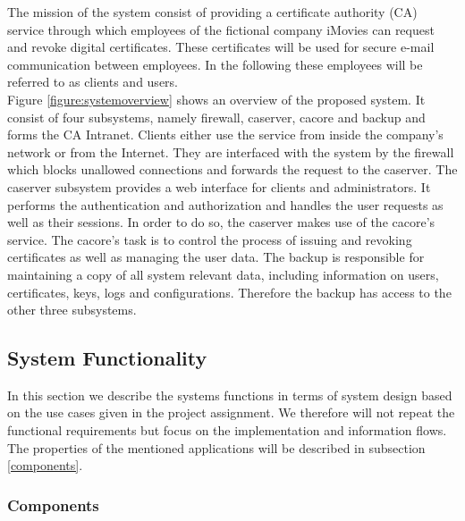 \documentclass[english]{article}
\begin{document}
The mission of the system consist of providing a certificate authority (CA) service through which employees of the fictional company iMovies can request and revoke digital certificates. These certificates will be used for secure e-mail communication between employees. In the following these employees will be referred to as clients and users.\\
Figure {\ref{figure:systemoverview}} shows an overview of the proposed system. It consist of four subsystems, namely firewall, caserver, cacore and backup and forms the CA Intranet. Clients either use the service from inside the company's network or from the Internet. They are interfaced with the system by the firewall which blocks unallowed connections and forwards the request to the caserver. The caserver subsystem provides a web interface for clients and administrators. It performs the authentication and authorization and handles the user requests as well as their sessions. In order to do so, the caserver makes use of the cacore's service. The cacore's task is to control the process of issuing and revoking certificates as well as managing the user data. The backup is responsible for maintaining a copy of all system relevant data, including information on users, certificates, keys, logs and configurations. Therefore the backup has access to the other three subsystems.



\subsection{System Functionality} 
 In this section we describe the systems functions in terms of system design based on the use cases given in the project assignment. We therefore will not repeat the functional requirements but focus on the implementation and information flows. The properties of the mentioned applications will be described in subsection \ref{components}.
 
 \subsubsection{Components}
\end{document}
